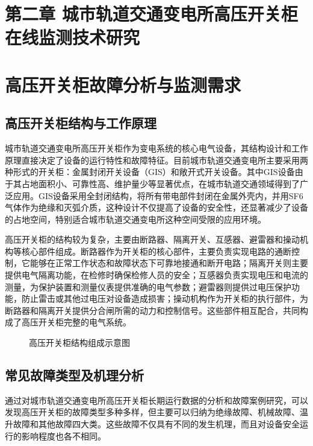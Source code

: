\section{第二章 城市轨道交通变电所高压开关柜在线监测技术研究}

\section{高压开关柜故障分析与监测需求}

\subsection{高压开关柜结构与工作原理}

城市轨道交通变电所高压开关柜作为变电系统的核心电气设备，其结构设计和工作原理直接决定了设备的运行特性和故障特征。目前城市轨道交通变电所主要采用两种形式的开关柜：金属封闭开关设备（GIS）和敞开式开关设备。其中GIS设备由于其占地面积小、可靠性高、维护量少等显著优点，在城市轨道交通领域得到了广泛应用。GIS设备采用全封闭结构，将所有带电部件封闭在金属外壳内，并用SF6气体作为绝缘和灭弧介质，这种设计不仅提高了设备的安全性，还显著减少了设备的占地空间，特别适合城市轨道交通变电所这种空间受限的应用环境。

高压开关柜的结构较为复杂，主要由断路器、隔离开关、互感器、避雷器和操动机构等核心部件组成。断路器作为开关柜的核心部件，主要负责实现电路的通断控制，它能够在正常工作状态和故障状态下可靠地接通和断开电路；隔离开关则主要提供电气隔离功能，在检修时确保检修人员的安全；互感器负责实现电压和电流的测量，为保护装置和测量仪表提供准确的电气参数；避雷器则提供过电压保护功能，防止雷击或其他过电压对设备造成损害；操动机构作为开关柜的执行部件，为断路器和隔离开关提供分合闸所需的动力和控制信号。这些部件相互配合，共同构成了高压开关柜完整的电气系统。

\begin{figure}[h]
\centering
\caption{高压开关柜结构组成示意图}
\label{fig:switchgear_structure}
\end{figure}

\subsection{常见故障类型及机理分析}

通过对城市轨道交通变电所高压开关柜长期运行数据的分析和故障案例研究，可以发现高压开关柜的故障类型多种多样，但主要可以归纳为绝缘故障、机械故障、温升故障和其他故障四大类。这些故障不仅具有不同的发生机理，而且对设备安全运行的影响程度也各不相同。

